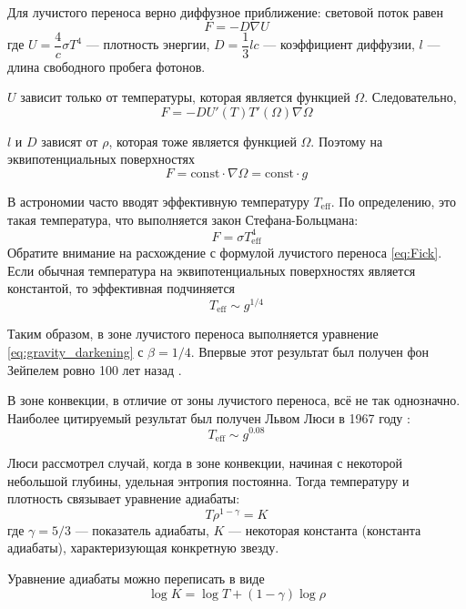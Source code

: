 Для лучистого переноса верно диффузное приближение: световой поток равен
\begin{equation}
F = -D \nabla U
\label{eq:Fick}
\end{equation}
где $U = \dfrac{4}{c} \sigma T^4$ --- плотность энергии, $D = \dfrac{1}{3} l c$ --- коэффициент диффузии, $l$ --- длина свободного пробега фотонов.

$U$ зависит только от температуры, которая является функцией $\Omega$. Следовательно,
\[
F = - D U'(T) T'(\Omega) \nabla \Omega
\]

$l$ и $D$ зависят от $\rho$, которая тоже является функцией $\Omega$. Поэтому на эквипотенциальных поверхностях
\[
F = \text{const} \cdot \nabla \Omega = \text{const} \cdot g
\]

В астрономии часто вводят эффективную температуру $T_\text{eff}$. По определению, это такая температура, что выполняется закон Стефана-Больцмана: 
\[
F = \sigma T_\text{eff}^4
\]
Обратите внимание на расхождение с формулой лучистого переноса \eqref{eq:Fick}. Если обычная температура на эквипотенциальных поверхностях является константой, то эффективная подчиняется
\[
T_\text{eff} \sim g^{1/4}
\]

Таким образом, в зоне лучистого переноса выполняется уравнение \eqref{eq:gravity_darkening} с $\beta = 1/4$.
Впервые этот результат был получен фон Зейпелем ровно 100 лет назад \cite{vonZeipel}.



В зоне конвекции, в отличие от зоны лучистого переноса, всё не так однозначно. Наиболее цитируемый результат был получен Львом Люси в 1967 году \cite{Lucy}:
\[
T_\text{eff} \sim g^{0.08}
\]

Люси рассмотрел случай, когда в зоне конвекции, начиная с некоторой небольшой глубины, удельная энтропия постоянна. Тогда температуру и плотность связывает уравнение адиабаты:
\begin{equation*}
T \rho^{1 - \gamma} = K
\label{eq:adiabat}
\end{equation*}
где $\gamma = 5/3$ --- показатель адиабаты, $K$ --- некоторая константа (константа адиабаты), характеризующая конкретную звезду.

Уравнение адиабаты можно переписать в виде
\begin{equation}
\log K = \log T + (1 - \gamma) \log \rho
\label{eq:adiabat_log}
\end{equation}

